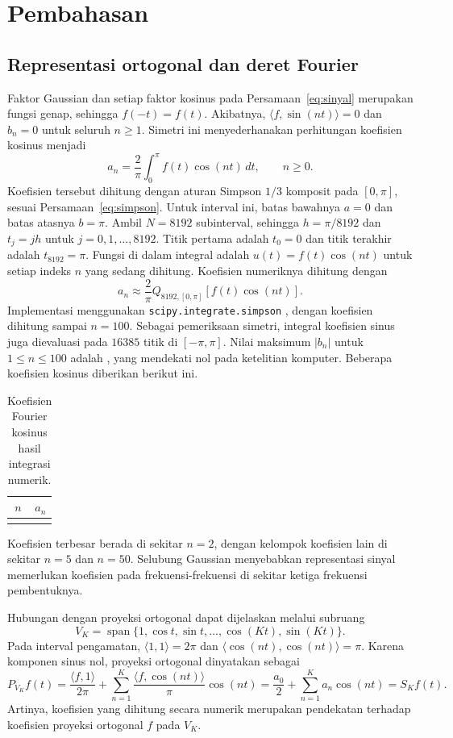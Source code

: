 \documentclass[11pt,a4paper]{article}
\makeatletter
\let\inputrows\@@input
\makeatother
\begin{document}
\section{Pembahasan}
\subsection{Representasi ortogonal dan deret Fourier}
Faktor Gaussian dan setiap faktor kosinus pada Persamaan~\eqref{eq:sinyal}
merupakan fungsi genap, sehingga $f(-t)=f(t)$. Akibatnya,
$\langle f,\sin(nt)\rangle=0$ dan $b_n=0$ untuk seluruh $n\geq1$.
Simetri ini menyederhanakan perhitungan koefisien kosinus menjadi
\[
 a_n=\frac2\pi\int_0^\pi f(t)\cos(nt)\,dt,\qquad n\geq0.
\]
Koefisien tersebut dihitung dengan aturan Simpson $1/3$ komposit
pada $[0,\pi]$, sesuai Persamaan~\eqref{eq:simpson}.
Untuk interval ini, batas bawahnya $a=0$ dan batas atasnya $b=\pi$.
Ambil $N=8192$ subinterval, sehingga $h=\pi/8192$ dan $t_j=jh$
untuk $j=0,1,\ldots,8192$. Titik pertama adalah $t_0=0$ dan titik
terakhir adalah $t_{8192}=\pi$. Fungsi di dalam integral adalah
$u(t)=f(t)\cos(nt)$ untuk setiap indeks $n$ yang sedang dihitung.
Koefisien numeriknya dihitung dengan
\[
 a_n\approx\frac2\pi Q_{8192,[0,\pi]}[f(t)\cos(nt)].
\]
Implementasi menggunakan \texttt{scipy.integrate.simpson}
\cite{scipy_simpson}, dengan koefisien dihitung sampai $n=100$.
Sebagai pemeriksaan simetri, integral koefisien sinus juga dievaluasi pada
$16385$ titik di $[-\pi,\pi]$. Nilai maksimum $|b_n|$ untuk
$1\leq n\leq100$ adalah \MaksSinus, yang mendekati nol pada
ketelitian komputer. Beberapa koefisien kosinus diberikan berikut ini.

\begin{table}[H]
 \centering
 \caption{Koefisien Fourier kosinus hasil integrasi numerik.}
 \label{tab:koefisien}
 \begin{tabular}{r|r}
  \hline
  $n$ & $a_n$ \\ \hline
  \inputrows{hasil_numerik/koefisien.tex}
 \end{tabular}
\end{table}
Koefisien terbesar berada di sekitar $n=2$, dengan kelompok koefisien
lain di sekitar $n=5$ dan $n=50$. Selubung Gaussian menyebabkan
representasi sinyal memerlukan koefisien pada frekuensi-frekuensi di
sekitar ketiga frekuensi pembentuknya.

Hubungan dengan proyeksi ortogonal dapat dijelaskan melalui subruang
\[
 V_K=\operatorname{span}\{1,\cos t,\sin t,\ldots,\cos(Kt),\sin(Kt)\}.
\]
Pada interval pengamatan, $\langle1,1\rangle=2\pi$ dan
$\langle\cos(nt),\cos(nt)\rangle=\pi$. Karena komponen sinus nol,
proyeksi ortogonal dinyatakan sebagai
\[
 P_{V_K}f(t)=\frac{\langle f,1\rangle}{2\pi}
 +\sum_{n=1}^{K}\frac{\langle f,\cos(nt)\rangle}{\pi}\cos(nt)
 =\frac{a_0}{2}+\sum_{n=1}^{K}a_n\cos(nt)=S_Kf(t).
\]
Artinya, koefisien yang dihitung secara numerik merupakan pendekatan
terhadap koefisien proyeksi ortogonal $f$ pada $V_K$.
\end{document}
